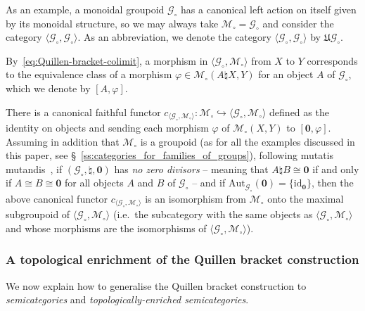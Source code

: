 \documentclass[AHL,Unicode,published]{cedram}
\newcommand{\Aut}{\mathrm{Aut}}
\newcommand{\id}{\mathrm{id}}
\newcommand{\zero}{\mathbf{0}}
\newcommand{\fU}{\ensuremath{\mathfrak{U}}}
\newcommand{\cG}{\mathcal{G}}
\newcommand{\cM}{\mathcal{M}}
\begin{document}
\begin{exam}\label{eg:UG}
As an example, a monoidal groupoid $\cG_{\circ}$ has a canonical left action on itself given by its monoidal structure, so we may always take $\cM_{\circ} = \cG_{\circ}$ and consider the category $\langle \cG_{\circ},\cG_{\circ} \rangle$. As an abbreviation, we denote the category $\langle \cG_{\circ},\cG_{\circ} \rangle$ by $\fU\cG_{\circ}$.
\end{exam}

\begin{nota}\label{not:Quillen-bracket-construction}
By~\eqref{eq:Quillen-bracket-colimit}, a morphism in $\langle \cG_{\circ},\cM_{\circ}\rangle$ from $X$ to $Y$ corresponds to the equivalence class of a morphism $\varphi \in \cM_{\circ}(A \natural X,Y)$ for an object $A$ of $\cG_{\circ}$, which we denote by $[A,\varphi]$.
\end{nota}

There is a canonical faithful functor $c_{\langle \cG_{\circ},\cM_{\circ}\rangle }\colon\cM_{\circ}\hookrightarrow\langle \cG_{\circ},\cM_{\circ}\rangle $ defined as the identity on objects and sending each morphism $\varphi$ of $\cM_{\circ}(X,Y)$ to $[\zero,\varphi]$. Assuming in addition that $\cM_{\circ}$ is a groupoid (as for all the examples discussed in this paper, see \S~\ref{ss:categories_for_families_of_groups}), following mutatis mutandis~\cite[Prop.~1.7]{RWW}, if $(\cG_{\circ},\natural,\zero)$ has \emph{no zero divisors} -- meaning that $A\natural B\cong \zero$ if and only if $A\cong B\cong \zero$ for all objects $A$ and $B$ of $\cG_{\circ}$ -- and if $\Aut_{\cG_{\circ}}(\zero)=\{\id_{\zero}\}$, then the above canonical functor $c_{\langle \cG_{\circ},\cM_{\circ}\rangle }$ is an isomorphism from $\cM_{\circ}$ onto the maximal subgroupoid of $\langle \cG_{\circ},\cM_{\circ} \rangle$ (i.e.~the subcategory with the same objects as $\langle \cG_{\circ},\cM_{\circ}\rangle$ and whose morphisms are the isomorphisms of $\langle \cG_{\circ},\cM_{\circ}\rangle$).


\subsubsection{A topological enrichment of the Quillen bracket construction}\label{sss:Topological-Quillen}

We now explain how to generalise the Quillen bracket construction to \emph{semicategories} and \emph{topologically-enriched semicategories}.
\end{document}
